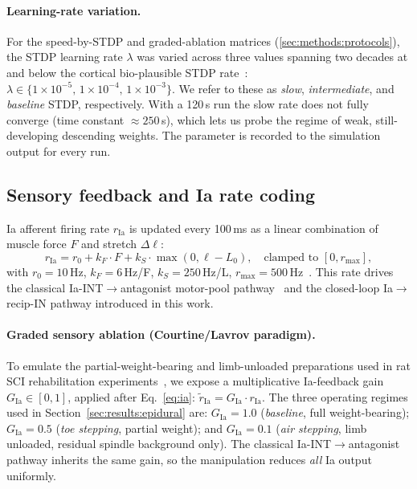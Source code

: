 \paragraph{Learning-rate variation.}
For the speed-by-STDP and graded-ablation matrices
(\autoref{sec:methods:protocols}), the STDP learning rate $\lambda$ was
varied across three values spanning two decades at and below the
cortical bio-plausible STDP rate~\cite{biPoo1998,morrison2007}:
$\lambda \in \{1{\times}10^{-5},\,1{\times}10^{-4},\,1{\times}10^{-3}\}$.
We refer to these as \emph{slow}, \emph{intermediate}, and
\emph{baseline} STDP, respectively. With a 120\,s run the slow rate does
not fully converge (time constant $\approx 250$\,s), which lets us probe
the regime of weak, still-developing descending weights. The parameter
is recorded to the simulation output for every run.

\subsection{Sensory feedback and Ia rate coding}\label{sec:methods:ia}
Ia afferent firing rate $r_{\text{Ia}}$ is updated every 100\,ms as a
linear combination of muscle force $F$ and stretch $\Delta\ell$:
\begin{equation}
  r_{\text{Ia}} = r_0 + k_F \cdot F + k_S \cdot \max(0, \ell - L_0),
  \quad \text{clamped to } [0, r_{\max}],
  \label{eq:ia}
\end{equation}
with $r_0=10$\,Hz, $k_F=6$\,Hz/F, $k_S=250$\,Hz/L,
$r_{\max}=500$\,Hz~\cite{loeb1981,prochazka1999}. This rate drives the
classical Ia-INT$\to$antagonist motor-pool
pathway~\cite{jankowska1992} and the closed-loop Ia$\to$recip-IN pathway
introduced in this work.

\paragraph{Graded sensory ablation (Courtine/Lavrov paradigm).}
To emulate the partial-weight-bearing and limb-unloaded preparations
used in rat SCI rehabilitation
experiments~\cite{lavrov2008,courtine2009,edgerton2008}, we expose a
multiplicative Ia-feedback gain $G_{\text{Ia}} \in [0, 1]$, applied
after Eq.~\ref{eq:ia}:
$\tilde{r}_{\text{Ia}} = G_{\text{Ia}}\cdot r_{\text{Ia}}$. The three
operating regimes used in Section~\ref{sec:results:epidural} are:
$G_{\text{Ia}}=1.0$ (\emph{baseline}, full weight-bearing);
$G_{\text{Ia}}=0.5$ (\emph{toe stepping}, partial weight); and
$G_{\text{Ia}}=0.1$ (\emph{air stepping}, limb unloaded, residual
spindle background only). The classical Ia-INT$\to$antagonist pathway
inherits the same gain, so the manipulation reduces \emph{all} Ia
output uniformly.

